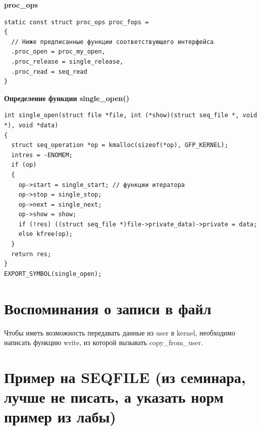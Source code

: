 \textbf{proc\_ops}

\begin{lstlisting}
static const struct proc_ops proc_fops =
{
  // Ниже предписанные функции соответствующего интерфейса
  .proc_open = proc_my_open,
  .proc_release = single_release,
  .proc_read = seq_read
}
\end{lstlisting}

\textbf{Определение функции single\_open()}

\begin{lstlisting}
int single_open(struct file *file, int (*show)(struct seq_file *, void *), void *data)
{
  struct seq_operation *op = kmalloc(sizeof(*op), GFP_KERNEL);
  intres = -ENOMEM;
  if (op)
  {
    op->start = single_start; // функции итератора
    op->stop = single_stop;
    op->next = single_next;
    op->show = show;
    if (!res) ((struct seq_file *)file->private_data)->private = data;
    else kfree(op);
  }
  return res;
}
EXPORT_SYMBOL(single_open);
\end{lstlisting}

\section{Воспоминания о записи в файл}
Чтобы иметь возможность передавать данные из user в kernel, необходимо написать функцию write, из которой вызывать copy\_from\_user.

\section{Пример на SEQFILE (из семинара, лучше не писать, а указать норм пример из лабы)}

